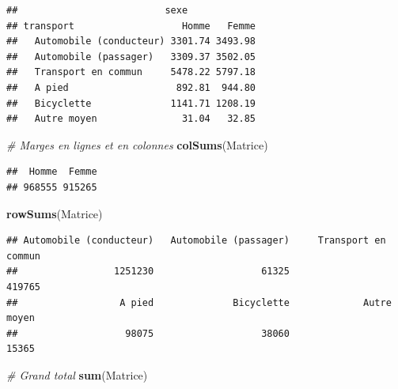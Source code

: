 \documentclass[
  11pt,
  french,
]{book}
\makeatletter
\newenvironment{Shaded}{\begin{snugshade}}{\end{snugshade}}
\newcommand{\CommentTok}[1]{\textcolor[rgb]{0.56,0.35,0.01}{\textit{#1}}}
\newcommand{\DecValTok}[1]{\textcolor[rgb]{0.00,0.00,0.81}{#1}}
\newcommand{\KeywordTok}[1]{\textcolor[rgb]{0.13,0.29,0.53}{\textbf{#1}}}
\newcommand{\NormalTok}[1]{#1}
\newcommand{\OperatorTok}[1]{\textcolor[rgb]{0.81,0.36,0.00}{\textbf{#1}}}
\newenvironment{kframe}{%
\medskip{}
\setlength{\fboxsep}{.8em}
 \def\at@end@of@kframe{}%
 \ifinner\ifhmode%
  \def\at@end@of@kframe{\end{minipage}}%
  \begin{minipage}{\columnwidth}%
 \fi\fi%
 \def\FrameCommand##1{\hskip\@totalleftmargin \hskip-\fboxsep
 \colorbox{shadecolor}{##1}\hskip-\fboxsep
     \hskip-\linewidth \hskip-\@totalleftmargin \hskip\columnwidth}%
 \MakeFramed {\advance\hsize-\width
   \@totalleftmargin\z@ \linewidth\hsize
   \@setminipage}}%
 {\par\unskip\endMakeFramed%
 \at@end@of@kframe}
\renewenvironment{Shaded}{\begin{kframe}}{\end{kframe}}
\makeatother
\begin{document}
\begin{Shaded}
\end{Shaded}

\begin{verbatim}
##                          sexe
## transport                   Homme   Femme
##   Automobile (conducteur) 3301.74 3493.98
##   Automobile (passager)   3309.37 3502.05
##   Transport en commun     5478.22 5797.18
##   A pied                   892.81  944.80
##   Bicyclette              1141.71 1208.19
##   Autre moyen               31.04   32.85
\end{verbatim}

\begin{Shaded}
\begin{Highlighting}[]
\CommentTok{# Marges en lignes et en colonnes}
\KeywordTok{colSums}\NormalTok{(Matrice)}
\end{Highlighting}
\end{Shaded}

\begin{verbatim}
##  Homme  Femme 
## 968555 915265
\end{verbatim}

\begin{Shaded}
\begin{Highlighting}[]
\KeywordTok{rowSums}\NormalTok{(Matrice)}
\end{Highlighting}
\end{Shaded}

\begin{verbatim}
## Automobile (conducteur)   Automobile (passager)     Transport en commun 
##                 1251230                   61325                  419765 
##                  A pied              Bicyclette             Autre moyen 
##                   98075                   38060                   15365
\end{verbatim}

\begin{Shaded}
\begin{Highlighting}[]
\CommentTok{# Grand total}
\KeywordTok{sum}\NormalTok{(Matrice)}
\end{Highlighting}
\end{Shaded}
\end{document}
